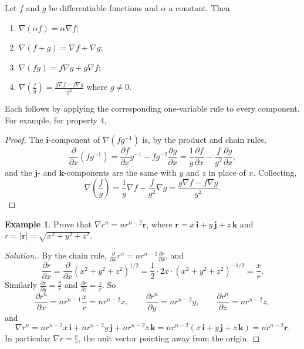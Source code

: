 \documentclass[11pt,a4paper]{article}
\theoremstyle{definition}
\newtheorem{exa}[thm]{Example}
\newenvironment{solution}
  {\renewcommand{\qedsymbol}{}\begin{proof}[\textit{Solution}.]}
  {\end{proof}}
\begin{document}
Let $f$ and $g$ be differentiable functions and $\alpha$ a constant. Then
\begin{enumerate}
\item $\nabla (\alpha f) = \alpha \nabla f$;

\item $\nabla (f + g) = \nabla f + \nabla g$;

\item $\nabla (fg) = f\nabla g + g \nabla f$;

\item $\nabla \left(\frac{f}{g}\right) = \frac{g\nabla f - f \nabla g}{g^2}$
where $g\neq 0$.
\end{enumerate}
Each follows by applying the corresponding one-variable rule to every component.
For example, for property 4,
\begin{proof}
The $\mathbf i$-component of $\nabla (fg^{-1})$ is, by the product and chain
rules,
\[\frac{\partial}{\partial x}(fg^{-1}) = \frac{\partial f}{\partial x}g^{-1} -
fg^{-2}\frac{\partial g}{\partial x} = \frac{1}{g}\frac{\partial f}{\partial x} -
\frac{f}{g^2}\frac{\partial g}{\partial x} ,\]
and the $\mathbf j$- and $\mathbf k$-components are the same with $y$ and $z$ in
place of $x$. Collecting,
\[\nabla \left(\frac{f}{g}\right) = \frac{1}{g}\nabla f - \frac{f}{g^2}\nabla g =
\frac{g \nabla f - f \nabla g }{g^2} .\]
\end{proof}

\begin{exa}
\label{ex:gradrn}
Prove that $\nabla r^{n} = n r^{n-2}\mathbf r$, where
$\mathbf r = x\,\mathbf i + y\,\mathbf j + z\,\mathbf k$ and $r = |\mathbf r| =
\sqrt{x^2 + y^2 + z^2}$.
\end{exa}

\begin{solution}
By the chain rule, $\frac{\partial}{\partial x}r^n = n r^{n-1} \frac{\partial
r}{\partial x}$, and
\[\frac{\partial r}{\partial x} = \frac{\partial}{\partial x} (x^2 + y^2 +
z^2)^{1/2} = \frac{1}{2}\cdot 2x\cdot (x^2 + y^2 + z^2)^{-1/2} = \frac{x}{r} .\]
Similarly $\frac{\partial r}{\partial y} = \frac{y}{r}$ and
$\frac{\partial r}{\partial z} = \frac{z}{r}$. So
\[\frac{\partial r^n}{\partial x} = nr^{n-1} \frac{x}{r} = nr^{n-2}x ,\qquad
\frac{\partial r^n}{\partial y} = nr^{n-2}y ,\qquad \frac{\partial r^n}{\partial
z}= nr^{n-2}z ,\]
and
\[\nabla r^n = nr^{n-2}x \,\mathbf i + nr^{n-2} y \,\mathbf j + nr^{n-2}
z\,\mathbf k = nr^{n-2} (x\,\mathbf i + y \,\mathbf j + z\,\mathbf k) =
nr^{n-2}\mathbf r .\]
In particular $\nabla r = \frac{\mathbf r}{r}$, the unit vector pointing away from
the origin.
\end{solution}
\end{document}
